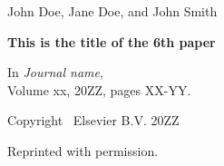 \documentclass[officiallayout]{tktla}
\begin{document}
\vspace{80pt}
\noindent John Doe, Jane Doe, and John Smith

\vspace{10pt}
\noindent\textbf{This is the title of the 6th paper}


\vspace{10pt}
\noindent
In \emph{Journal name}, \\Volume xx, 20ZZ, pages XX-YY.

\vspace{60pt}
\noindent Copyright \textcopyright\ Elsevier B.V. 20ZZ

\noindent Reprinted with permission.

\cleardoublepage
%

\end{document}
